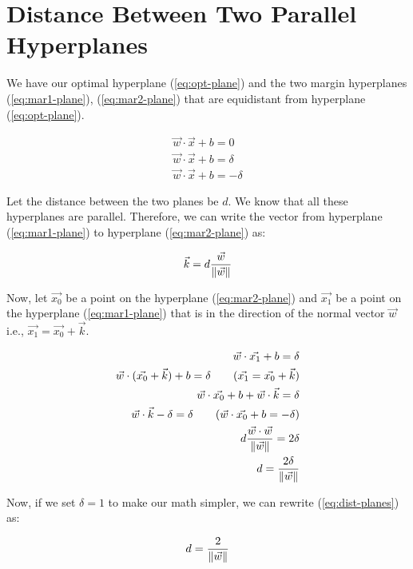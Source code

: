 \section{Distance Between Two Parallel Hyperplanes}
\label{appendix:distance}

We have our optimal hyperplane (\ref{eq:opt-plane}) and the two margin hyperplanes (\ref{eq:mar1-plane}), (\ref{eq:mar2-plane}) that are equidistant from hyperplane (\ref{eq:opt-plane}).

\begin{align}
	\vec{w}\cdot\vec{x} + b = 0 \label{eq:opt-plane} \\
	\vec{w}\cdot\vec{x} + b = \delta \label{eq:mar1-plane} \\
	\vec{w}\cdot\vec{x} + b = -\delta \label{eq:mar2-plane}
\end{align}

Let the distance between the two planes be $d$. We know that all these hyperplanes are parallel. Therefore, we can write the vector from hyperplane (\ref{eq:mar1-plane}) to hyperplane (\ref{eq:mar2-plane}) as:

\begin{equation}
	\vec{k} = d\frac{\vec{w}}{\left\lVert\vec{w}\right\rVert}
\end{equation}

Now, let $\vec{x_0}$ be a point on the hyperplane (\ref{eq:mar2-plane}) and $\vec{x_1}$ be a point on the hyperplane (\ref{eq:mar1-plane}) that is in the direction of the normal vector $\vec{w}$ i.e., $\vec{x_1} = \vec{x_0} + \vec{k}$.

\begin{align}
	\vec{w}\cdot\vec{x_1} + b = \delta \nonumber\\
	\vec{w}\cdot(\vec{x_0} + \vec{k}) + b = \delta \tag*{($\vec{x_1} = \vec{x_0} + \vec{k}$)}\nonumber\\
	\vec{w}\cdot\vec{x_0} + b + \vec{w}\cdot\vec{k} = \delta \nonumber\\
	\vec{w}\cdot\vec{k} - \delta = \delta \tag*{($\vec{w}\cdot\vec{x_0} + b = -\delta$)}\nonumber\\
	d\frac{\vec{w}\cdot\vec{w}}{\norm{\vec{w}}} = 2\delta \nonumber\\
	d = \frac{2\delta}{\norm{\vec{w}}} \label{eq:dist-planes}
\end{align}

Now, if we set $\delta = 1$ to make our math simpler, we can rewrite (\ref{eq:dist-planes}) as:

\begin{equation}
	d = \frac{2}{\left\lVert\vec{w}\right\rVert} \nonumber
\end{equation}
